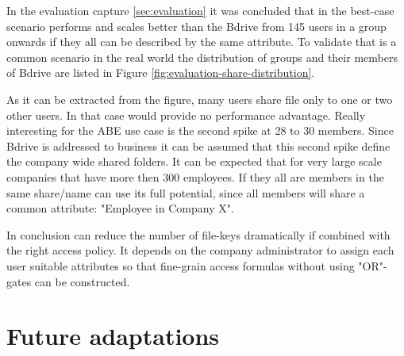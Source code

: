 In the evaluation capture \ref{sec:evaluation} it was concluded that in the best-case scenario \name performs and scales better than the Bdrive from 145 users in a group onwards if they all can be described by the same attribute. To validate that is a common scenario in the real world the distribution of groups and their members of Bdrive are listed in Figure \ref{fig:evaluation-share-distribution}.

As it can be extracted from the figure, many users share file only to one or two other users. In that case would \name provide no performance  advantage. Really interesting for the ABE use case is the second spike at 28 to 30 members. Since Bdrive is addressed to business it can be assumed that this second spike define the company wide shared folders. It can be expected that for very large scale companies that have more then 300 employees. If they all are members in the same share/name can use its full potential, since all members will share a common attribute: "Employee in Company X".

In conclusion \name can reduce the number of file-keys dramatically if combined with the right access policy. It depends on the company administrator to assign each user suitable attributes so that fine-grain access formulas without using "OR"-gates can be constructed.  
\section{Future adaptations}

